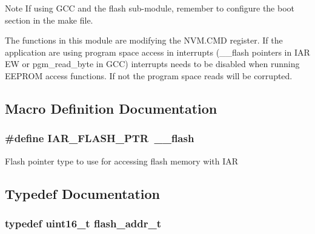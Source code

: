 \begin{DoxyNote}{Note}
If using G\-C\-C and the flash sub-\/module, remember to configure the boot section in the make file.

The functions in this module are modifying the N\-V\-M.\-C\-M\-D register. If the application are using program space access in interrupts (\-\_\-\-\_\-flash pointers in I\-A\-R E\-W or pgm\-\_\-read\-\_\-byte in G\-C\-C) interrupts needs to be disabled when running E\-E\-P\-R\-O\-M access functions. If not the program space reads will be corrupted. 
\end{DoxyNote}


\subsection{Macro Definition Documentation}
\hypertarget{group__nvm__flash__group_ga1ff021ee17a7d4814fe900414e870c4f}{
\subsubsection[{I\-A\-R\-\_\-\-F\-L\-A\-S\-H\-\_\-\-P\-T\-R}]{\setlength{\rightskip}{0pt plus 5cm}\#define I\-A\-R\-\_\-\-F\-L\-A\-S\-H\-\_\-\-P\-T\-R~\-\_\-\-\_\-flash}}\label{group__nvm__flash__group_ga1ff021ee17a7d4814fe900414e870c4f}
Flash pointer type to use for accessing flash memory with I\-A\-R 

\subsection{Typedef Documentation}
\hypertarget{group__nvm__flash__group_ga95a069fc064dc9cd089b7d9047b909b0}{
\subsubsection[{flash\-\_\-addr\-\_\-t}]{\setlength{\rightskip}{0pt plus 5cm}typedef uint16\-\_\-t {\bf flash\-\_\-addr\-\_\-t}}}\label{group__nvm__flash__group_ga95a069fc064dc9cd089b7d9047b909b0}


